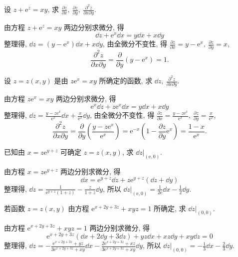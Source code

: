 \begin{example}
    设 $z+\mathrm{e}^z=xy$, 求 $\displaystyle\frac{\partial z}{\partial x},~\frac{\partial z}{\partial y},~\frac{\partial^2z}{\partial x\partial y}.$
\end{example}
\begin{solution}
    由方程 $z+\mathrm{e}^z=xy$ 两边分别求微分, 得
    $$\dd z+\mathrm{e}^x\dd x=y\dd x+x\dd y$$
    整理得, $\dd z=(y-\mathrm{e}^x)\dd x+x\dd y$, 由全微分不变性, 得 $\displaystyle\frac{\partial z}{\partial x}=y-\mathrm{e}^x,~\frac{\partial z}{\partial y}=x$, 
    $$\frac{\partial ^2z}{\partial x\partial y}=\frac{\partial }{\partial y}\left(y-\mathrm{e}^x\right)=1.$$
\end{solution}

\begin{example}
    设 $z=z(x,y)$ 是由 $z\mathrm{e}^x=xy$ 所确定的函数, 求 $\displaystyle\dd z,~\frac{\partial^2z}{\partial x\partial y}.$
\end{example}
\begin{solution}
    由方程 $z\mathrm{e}^x=xy$ 两边分别求微分, 得
    $$\mathrm{e}^x\dd z+z\mathrm{e}^x\dd x=y\dd x+x\dd y$$
    整理得, $\displaystyle\dd z=\frac{y-z\mathrm{e}^x}{\mathrm{e}^x}\dd x+\frac{x}{\mathrm{e}^x}\dd y$, 由全微分不变性, 得 $\displaystyle\frac{\partial z}{\partial x}=\frac{y-z\mathrm{e}^x}{\mathrm{e}^x},~\frac{\partial z}{\partial y}=\frac{x}{\mathrm{e}^x}$, 
    $$\frac{\partial^2z}{\partial x\partial y}=\frac{\partial}{\partial y}\left(\frac{y-z\mathrm{e}^x}{\mathrm{e}^x}\right)=\mathrm{e}^{-x}\left(1-\frac{\partial z}{\partial y}\mathrm{e}^x\right)=\frac{1-x}{\mathrm{e}^x}.$$
\end{solution}

\begin{example}[2006 年江苏省高等数学竞赛题]
    已知由 $x=z\mathrm{e}^{y+z}$ 可确定 $z=z(x,y)$, 求 $\dd z|_{(\mathrm{e},0)}.$
\end{example}
\begin{solution}
    由方程 $x=z\mathrm{e}^{y+z}$ 两边分别求微分, 得
    $$\dd x=\mathrm{e}^{y+z}\dd z+z\mathrm{e}^{y+z}(\dd z+\dd y)$$
    整理得, $\displaystyle \dd z=\frac{1}{\mathrm{e}^{y+z}(1+z)}-\frac{z}{1+z}\dd y$, 所以 $\displaystyle\dd z|_{(\mathrm{e,0})}=\frac{1}{2\mathrm{e}}\dd x-\frac{1}{2}\dd y$.
\end{solution}

\begin{example}[2015 数二]
    若函数 $z=z(x,y)$ 由方程 $\mathrm{e}^{x+2y+3z}+xyz=1$ 所确定, 求 $\dd z|_{(0,0)}.$
\end{example}
\begin{solution}
    由方程 $\mathrm{e}^{x+2y+3z}+xyz=1$ 两边分别求微分, 得
    $$\mathrm{e}^{x+2y+3z}(\dd x+2\dd y+3\dd z)+yz\dd x+xz\dd y+xy\dd z=0$$
    整理得, $\displaystyle\dd z=-\frac{\mathrm{e}^{x+2y+3z}+yz}{3\mathrm{e}^{x+2y+3z}+xy}\dd x-\frac{2\mathrm{e}^{x+2y+3z}+xz}{3\mathrm{e}^{x+2y+3z}+xy}\dd y$, 所以 $\displaystyle\dd z|_{(0,0)}=-\frac{1}{3}\dd x-\frac{2}{3}\dd y$.
\end{solution}

